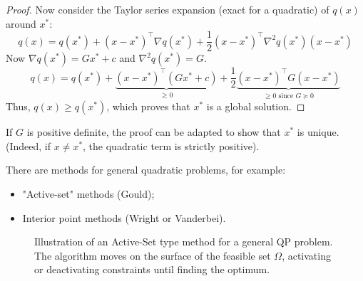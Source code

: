 \begin{proof}
        Now consider the Taylor series expansion (exact for a quadratic) of $q(x)$ around $x^*$:
        \begin{equation}
            q(x) = q(x^*) + (x - x^*)^\top \nabla q(x^*) + \frac{1}{2} (x - x^*)^\top \nabla^2 q(x^*) (x - x^*)
        \end{equation}
        Now $\nabla q(x^*) = G x^* + c$ and $\nabla^2 q(x^*) = G$.
        \begin{equation}
            q(x) = q(x^*) + \underbrace{(x - x^*)^\top (G x^* + c)}_{\ge 0} + \frac{1}{2} \underbrace{(x - x^*)^\top G (x - x^*)}_{\ge 0 \text{ since } G \succeq 0}
        \end{equation}
        Thus, $q(x) \ge q(x^*)$, which proves that $x^*$ is a global solution.
    \end{proof}

    \begin{remarque}
        If $G$ is positive definite, the proof can be adapted to show that $x^*$ is unique.
        (Indeed, if $x \neq x^*$, the quadratic term is strictly positive).
    \end{remarque}


\begin{remarque}
    There are methods for general quadratic problems, for example:
    \begin{itemize}
        \item "Active-set" methods (Gould);
        \item Interior point methods (Wright or Vanderbei).
    \end{itemize}
\end{remarque}

\begin{figure}[H]
\centering
{}
\caption{Illustration of an Active-Set type method for a general QP problem. The algorithm moves on the surface of the feasible set $\Omega$, activating or deactivating constraints until finding the optimum.}
\label{fig:generic-active-set}
\end{figure}

